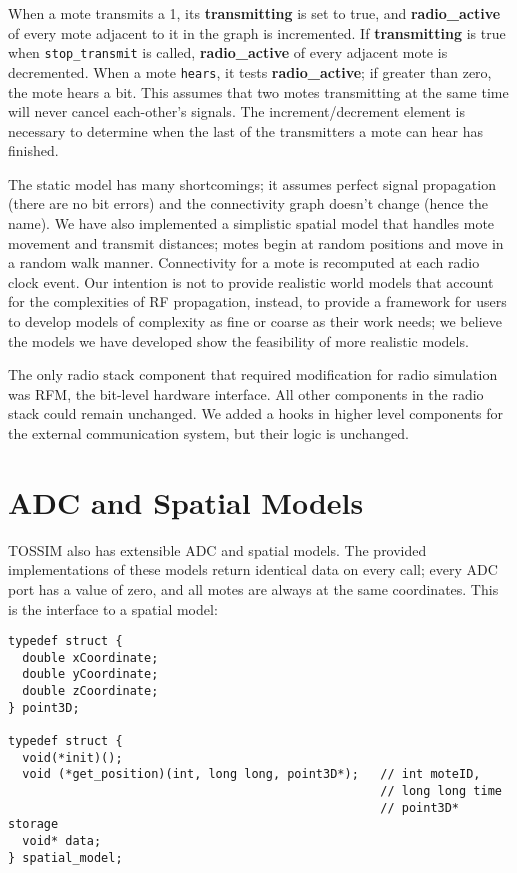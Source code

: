 \documentclass[12pt]{article}
\begin{document}
When a mote transmits a 1, its {\bf transmitting} is set to true, and
{\bf radio\_active} of every mote adjacent to it in the graph is
incremented. If {\bf transmitting} is true when {\tt stop\_transmit}
is called, {\bf radio\_active} of every adjacent mote is
decremented. When a mote {\tt hears}, it tests {\bf radio\_active}; if
greater than zero, the mote hears a bit. This assumes that two motes
transmitting at the same time will never cancel each-other's
signals. The increment/decrement element is necessary to determine
when the last of the transmitters a mote can hear has finished.

The static model has many shortcomings; it assumes perfect signal
propagation (there are no bit errors) and the connectivity graph
doesn't change (hence the name). We have also implemented a simplistic
spatial model that handles mote movement and transmit distances; motes
begin at random positions and move in a random walk
manner. Connectivity for a mote is recomputed at each radio clock
event. Our intention is not to provide realistic world models that
account for the complexities of RF propagation, instead, to provide a
framework for users to develop models of complexity as fine or coarse
as their work needs; we believe the models we have developed show the
feasibility of more realistic models.

The only radio stack component that required modification for radio
simulation was RFM, the bit-level hardware interface. All other
components in the radio stack could remain unchanged. We added a hooks
in higher level components for the external communication system, but
their logic is unchanged.

\section*{ADC and Spatial Models}

TOSSIM also has extensible ADC and spatial models. The provided
implementations of these models return identical data on every call;
every ADC port has a value of zero, and all motes are always at the
same coordinates. This is the interface to a spatial model:

\begin{verbatim}
typedef struct {
  double xCoordinate;
  double yCoordinate;
  double zCoordinate;
} point3D;

typedef struct {
  void(*init)();
  void (*get_position)(int, long long, point3D*);   // int moteID,
                                                    // long long time
                                                    // point3D* storage
  void* data;                
} spatial_model;
\end{verbatim}
\end{document}
